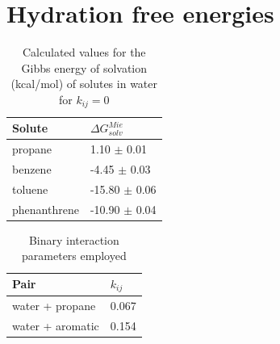 \section{Hydration free energies}

\FloatBarrier
\begin{table}[h]
	\centering
	\caption{Calculated values for the Gibbs energy of solvation (kcal/mol) of solutes in water for $k_{ij}=0$}
	\label{tbl:solv3}
	\begin{tabular}{ll}
		\hline
		Solute & $\Delta G_{solv}^{Mie}$ \\
		\hline
		propane   & 1.10 $\pm$ 0.01   \\
		benzene  & -4.45 $\pm$ 0.03   \\
		toluene  & -15.80 $\pm$ 0.06   \\
		phenanthrene & -10.90 $\pm$ 0.04   \\
		\hline
	\end{tabular}
\end{table}
\FloatBarrier

\begin{table}[h]
\centering
  \caption{Binary interaction parameters employed}
  \label{tbl:kij}
  \begin{tabular}{ll}
    \hline
      Pair & $k_{ij}$ \\
    \hline
    water  + propane      & 0.067  \\
    water  + aromatic      & 0.154 \\  
    \hline
  \end{tabular}

\end{table}

